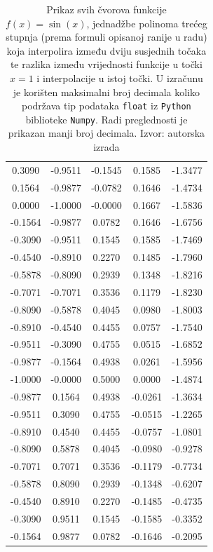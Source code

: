 \documentclass[12pt,a4paper]{report}
\begin{document}
\begin{table}
\begin{center}
\begin{tabular}{c c c|c | c}
0.3090 & -0.9511 & -0.1545 & 0.1585 & -1.3477 \\
0.1564 & -0.9877 & -0.0782 & 0.1646 & -1.4734 \\
0.0000 & -1.0000 & -0.0000 & 0.1667 & -1.5836 \\
-0.1564 & -0.9877 & 0.0782 & 0.1646 & -1.6756 \\
-0.3090 & -0.9511 & 0.1545 & 0.1585 & -1.7469 \\
-0.4540 & -0.8910 & 0.2270 & 0.1485 & -1.7960 \\
-0.5878 & -0.8090 & 0.2939 & 0.1348 & -1.8216 \\
-0.7071 & -0.7071 & 0.3536 & 0.1179 & -1.8230 \\
-0.8090 & -0.5878 & 0.4045 & 0.0980 & -1.8003 \\
-0.8910 & -0.4540 & 0.4455 & 0.0757 & -1.7540 \\
-0.9511 & -0.3090 & 0.4755 & 0.0515 & -1.6852 \\
-0.9877 & -0.1564 & 0.4938 & 0.0261 & -1.5956 \\
-1.0000 & -0.0000 & 0.5000 & 0.0000 & -1.4874 \\
-0.9877 & 0.1564 & 0.4938 & -0.0261 & -1.3634 \\
-0.9511 & 0.3090 & 0.4755 & -0.0515 & -1.2265 \\
-0.8910 & 0.4540 & 0.4455 & -0.0757 & -1.0801 \\
-0.8090 & 0.5878 & 0.4045 & -0.0980 & -0.9278 \\
-0.7071 & 0.7071 & 0.3536 & -0.1179 & -0.7734 \\
-0.5878 & 0.8090 & 0.2939 & -0.1348 & -0.6207 \\
-0.4540 & 0.8910 & 0.2270 & -0.1485 & -0.4735 \\
-0.3090 & 0.9511 & 0.1545 & -0.1585 & -0.3352 \\
-0.1564 & 0.9877 & 0.0782 & -0.1646 & -0.2095 \\
			
			
		\end{tabular}
	\end{center}
	\caption{
		Prikaz svih čvorova funkcije $f(x)=\sin(x)$, jednadžbe polinoma trećeg stupnja (prema formuli opisanoj ranije u radu) koja interpolira između dviju susjednih točaka te razlika između vrijednosti funkcije u točki $x=1$ i interpolacije u istoj točki. U izračunu je korišten maksimalni broj decimala koliko podržava tip podataka \texttt{float} iz \texttt{Python} biblioteke \texttt{Numpy}. Radi preglednosti je prikazan manji broj decimala. Izvor: autorska izrada}
	\label{kubInterpolTablicaSin}
\end{table}
{}

\end{document}
